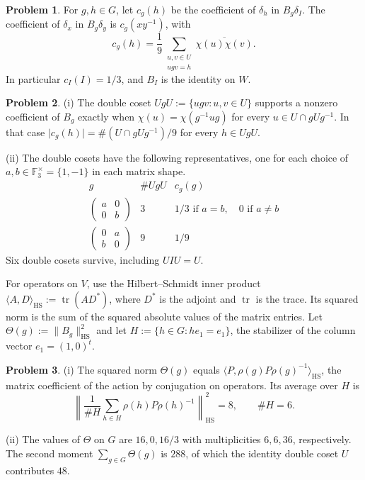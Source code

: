 \documentclass[reqno]{amsart}
\theoremstyle{definition}
\newtheorem{problem}{Problem}[section]
\theoremstyle{plain}
\begin{document}
\begin{problem}\label{pr:finite-unfold}
For \(g,h\in G\), let \(c_g(h)\) be the coefficient of \(\delta_h\) in \(B_g\delta_I\).  The coefficient of \(\delta_x\) in \(B_g\delta_y\) is \(c_g(xy^{-1})\), with
\[
  c_g(h)=\frac19\sum_{\substack{u,v\in U\\ugv=h}}
                     \overline{\chi(u)\chi(v)} .
\]
In particular \(c_I(I)=1/3\), and \(B_I\) is the identity on \(W\).
\end{problem}

\begin{problem}\label{pr:finite-double-cosets}
(i) The double coset \(UgU:=\{ugv:u,v\in U\}\) supports a nonzero coefficient of \(B_g\) exactly when \(\chi(u)=\chi(g^{-1}ug)\) for every \(u\in U\cap gUg^{-1}\).  In that case \(\lvert c_g(h)\rvert=\#(U\cap gUg^{-1})/9\) for every \(h\in UgU\).

(ii) The double cosets have the following representatives, one for each choice of \(a,b\in\mathbb{F}_3^\times=\{1,-1\}\) in each matrix shape.
\[
  \begin{array}{c|c|c}
    g & \# UgU & c_g(g) \\ \hline
    \begin{pmatrix}a&0\\0&b\end{pmatrix} & 3 &
      1/3\text{ if }a=b,\quad 0\text{ if }a\ne b\\[2pt]
    \begin{pmatrix}0&a\\b&0\end{pmatrix} & 9 & 1/9
  \end{array}
\]
Six double cosets survive, including \(UIU=U\).
\end{problem}

For operators on \(V\), use the Hilbert--Schmidt inner product \(\langle A,D\rangle_{\mathrm{HS}}:=\operatorname{tr}(AD^*)\), where \(D^*\) is the adjoint and \(\operatorname{tr}\) is the trace.  Its squared norm is the sum of the squared absolute values of the matrix entries.  Let \(\Theta(g):=\lVert B_g\rVert_{\mathrm{HS}}^2\) and let \(H:=\{h\in G:h e_1=e_1\}\), the stabilizer of the column vector \(e_1=(1,0)^t\).

\begin{problem}\label{pr:finite-hs}
(i) The squared norm \(\Theta(g)\) equals \(\langle P,\rho(g)P\rho(g)^{-1}\rangle_{\mathrm{HS}}\), the matrix coefficient of the action by conjugation on operators.  Its average over \(H\) is
\[
  \left\lVert \frac1{\#H}\sum_{h\in H}\rho(h)P\rho(h)^{-1}
  \right\rVert_{\mathrm{HS}}^2 = 8,
  \qquad \#H=6 .
\]

(ii) The values of \(\Theta\) on \(G\) are \(16,0,16/3\) with multiplicities \(6,6,36\), respectively.  The second moment \(\sum_{g\in G}\Theta(g)\) is \(288\), of which the identity double coset \(U\) contributes \(48\).
\end{problem}
\end{document}
